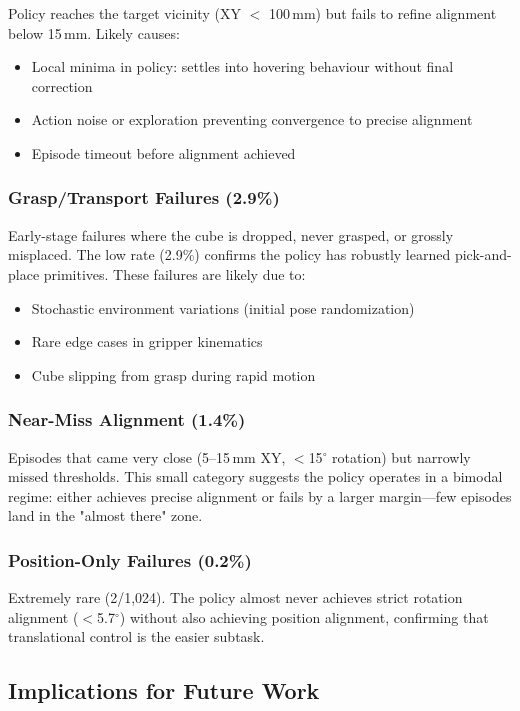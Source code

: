 \documentclass[12pt,a4paper,oneside]{report}
\begin{document}
Policy reaches the target vicinity (XY $<$ 100\,mm) but fails to refine alignment below 15\,mm. Likely causes:
\begin{itemize}
    \item Local minima in policy: settles into hovering behaviour without final correction
    \item Action noise or exploration preventing convergence to precise alignment
    \item Episode timeout before alignment achieved
\end{itemize}

\subsubsection{Grasp/Transport Failures (2.9\%)}

Early-stage failures where the cube is dropped, never grasped, or grossly misplaced. The low rate (2.9\%) confirms the policy has robustly learned pick-and-place primitives. These failures are likely due to:
\begin{itemize}
    \item Stochastic environment variations (initial pose randomization)
    \item Rare edge cases in gripper kinematics
    \item Cube slipping from grasp during rapid motion
\end{itemize}

\subsubsection{Near-Miss Alignment (1.4\%)}

Episodes that came very close (5--15\,mm XY, $<$15$^\circ$ rotation) but narrowly missed thresholds. This small category suggests the policy operates in a bimodal regime: either achieves precise alignment or fails by a larger margin---few episodes land in the "almost there" zone.

\subsubsection{Position-Only Failures (0.2\%)}

Extremely rare (2/1{,}024). The policy almost never achieves strict rotation alignment ($<$5.7$^\circ$) without also achieving position alignment, confirming that translational control is the easier subtask.

\subsection{Implications for Future Work}
\end{document}
